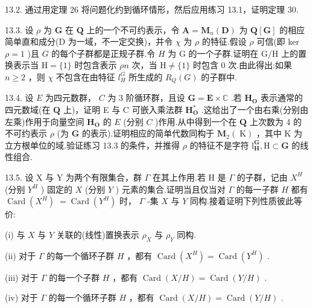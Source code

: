 \documentclass[10pt]{article}
\begin{document}
13.2. 通过用定理 26 将问题化约到循环情形，然后应用练习 13.1，证明定理 30.

13.3. 设 \(\rho\) 为 \(\mathbf{G}\) 在 \(\mathbf{Q}\) 上的一个不可约表示，令 \(\mathbf{A} = {\mathbf{M}}_{n}\left( \mathbf{D}\right)\) 为 \(\mathbf{Q}\left\lbrack  \mathbf{G}\right\rbrack\) 的相应简单直和成分(D 为一域，不一定交换)，并令 \(\chi\) 为 \(\rho\) 的特征.假设 \(\rho\) 可信(即 ker \(\rho  = 1\) )且 \(G\) 的每个子群都是正规子群.令 \(H\) 为 G 的一个子群.证明在 \(\mathrm{G}/\mathrm{H}\) 上的置换表示当 \(\mathrm{H} = \{ 1\}\) 时包含表示 \({\rho n}\) 次，当 \(\mathrm{H} \neq  \{ 1\}\) 时包含 0 次.由此得出:如果 \(n \geq  2\) ，则 \(\chi\) 不包含在由特征 \({l}_{H}^{G}\) 所生成的 \({R}_{Q}\left( G\right)\) 的子群中.

13.4. 设 \(E\) 为四元数群， \(C\) 为 3 阶循环群，且设 \(\mathbf{G} = \mathbf{E} \times  \mathbb{C}\) .若 \({\mathbf{H}}_{\mathbf{O}}\) 表示通常的四元数域(在 \(\mathbf{Q}\) 上)，证明 E 与 \(\mathrm{C}\) 可嵌入乘法群 \({\mathbf{H}}_{\mathbf{O}}^{ * }\) .这给出了一个由右乘(分别由左乘)作用于向量空间 \({\mathbf{H}}_{\mathbf{O}}\) 的 \(E\) (分别 \(C\) )作用.从中得到一个在 \(\mathbf{Q}\) 上次数为 4 的不可约表示 \(\rho\) (为 \(\mathbf{G}\) 的表示).证明相应的简单代数同构于 \({\mathbf{M}}_{2}\left( \mathrm{\;K}\right)\) ，其中 \(\mathrm{K}\) 为立方根单位的域.验证练习 13.3 的条件，并推得 \(\rho\) 的特征不是字符 \({\mathrm{l}}_{\mathbf{H}}^{\mathbf{G}},\mathrm{H} \subset  \mathbf{G}\) 的线性组合.

13.5. 设 \(\mathrm{X}\) 与 \(\mathrm{Y}\) 为两个有限集合，群 \(\Gamma\) 在其上作用.若 \(\mathrm{H}\) 是 \(\Gamma\) 的子群，记由 \({X}^{H}\) (分别 \({Y}^{H}\) ) 固定的 \(X\) (分别 \(Y\) ) 元素的集合.证明当且仅当对 \(\Gamma\) 的每一子群 \(H\) 都有 \(\operatorname{Card}\left( {X}^{H}\right) \; = \operatorname{Card}\left( {Y}^{H}\right)\) 时， \(\Gamma\) -集 \(X\) 与 \(Y\) 同构.接着证明下列性质彼此等价:

(i) 与 \(X\) 与 \(Y\) 关联的(线性)置换表示 \({\rho }_{X}\) 与 \({\rho }_{Y}\) 同构.

(ii) 对于 \(\Gamma\) 的每一个循环子群 \(H\) ，都有 \(\operatorname{Card}\left( {X}^{H}\right)  = \operatorname{Card}\left( {Y}^{H}\right)\) .

(iii) 对于 \(\Gamma\) 的每一个子群 \(H\) ，都有 \(\operatorname{Card}\left( {X/H}\right)  = \operatorname{Card}\left( {Y/H}\right)\) .

(iv) 对于 \(\Gamma\) 的每一个循环子群 \(H\) ，都有 \(\operatorname{Card}\left( {X/H}\right)  = \operatorname{Card}\left( {Y/H}\right)\) .
\end{document}

